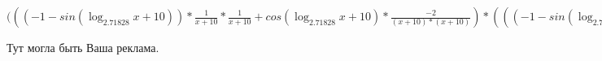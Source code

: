 \documentclass[12pt,a4paper,fleqn]{article}
\theoremstyle{definition}
\begin{document}
$((( -1  - sin(\log_{ 2.71828 }{ x  +  10 })) * \frac{ 1 }{ x  +  10 }
 * \frac{ 1 }{ x  +  10 }
 + cos(\log_{ 2.71828 }{ x  +  10 }) * \frac{ -2 }{( x  +  10 ) * ( x  +  10 )}
) * ((( -1  - sin(\log_{ 2.71828 }{ x  +  10 })) * \frac{ 1 }{ 1  * ( x  +  10 )}
 * \frac{ 1 }{ x  +  10 }
 + cos(\log_{ 2.71828 }{ x  +  10 }) * \frac{ 0  * ( x  +  10 ) -  1 }{( x  +  10 ) * ( x  +  10 )}
) * { 3 }^{sin(\log_{ 2.71828 }{ x  +  10 })} + cos(\log_{ 2.71828 }{ x  +  10 }) * \frac{ 1 }{ x  +  10 }
 *  1  * cos(\log_{ 2.71828 }{ x  +  10 }) * \frac{ 1 }{ 1  * ( x  +  10 )}
 * { 3 }^{sin(\log_{ 2.71828 }{ x  +  10 })}) = (( -1  - sin(\log_{ 2.71828 }{ x  +  10 })) * \frac{ 1 }{ x  +  10 }
 * \frac{ 1 }{ x  +  10 }
 + cos(\log_{ 2.71828 }{ x  +  10 }) * \frac{ -2 }{( x  +  10 ) * ( x  +  10 )}
) * ((( -1  - sin(\log_{ 2.71828 }{ x  +  10 })) * \frac{ 1 }{ 1  * ( x  +  10 )}
 * \frac{ 1 }{ x  +  10 }
 + cos(\log_{ 2.71828 }{ x  +  10 }) * \frac{ 0  * ( x  +  10 ) -  1 }{( x  +  10 ) * ( x  +  10 )}
) * { 3 }^{sin(\log_{ 2.71828 }{ x  +  10 })} + cos(\log_{ 2.71828 }{ x  +  10 }) * \frac{ 1 }{ x  +  10 }
 *  1  * cos(\log_{ 2.71828 }{ x  +  10 }) * \frac{ 1 }{ 1  * ( x  +  10 )}
 * { 3 }^{sin(\log_{ 2.71828 }{ x  +  10 })})$

Тут могла быть Ваша реклама.
\end{document}
